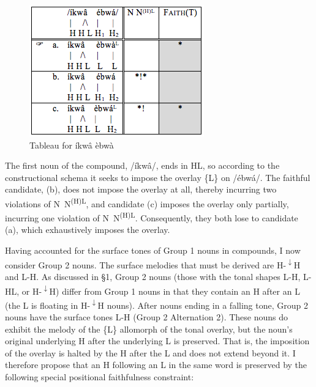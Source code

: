 \documentclass[output=paper]{langscibook}
\begin{document}
  
\begin{figure}
\includegraphics[width=\textwidth]{figures/glewwe-img3.png}
\caption{Tableau for \textup{íkwâ èbwà}}
\label{fig:glewwe:4}
\end{figure}

The first noun of the compound, /íkwâ/, ends in HL, so according to the constructional schema it seeks to impose the overlay \{L\} on /ébwá/. The faithful candidate, (b), does not impose the overlay at all, thereby incurring two violations of N~N\textsuperscript{(H)L}, and candidate (c) imposes the overlay only partially, incurring one violation of N~N\textsuperscript{(H)L}. Consequently, they both lose to candidate (a), which exhaustively imposes the overlay.     

Having accounted for the surface tones of Group 1 nouns in compounds, I now consider Group 2 nouns. The surface melodies that must be derived are H-\textsuperscript{$\downarrow$}H and L-H. As discussed in §1, Group 2 nouns (those with the tonal shapes L-H, L-HL, or H-\textsuperscript{$\downarrow$}H) differ from Group 1 nouns in that they contain an H after an L (the L is floating in H-\textsuperscript{$\downarrow$}H nouns). After nouns ending in a falling tone, Group 2 nouns have the surface tones L-H (Group 2 Alternation 2). These nouns do exhibit the melody of the \{L\} allomorph of the tonal overlay, but the noun’s original underlying H after the underlying L is preserved. That is, the imposition of the overlay is halted by the H after the L and does not extend beyond it. I therefore propose that an H following an L in the same word is preserved by the following special positional faithfulness constraint: 
\end{document}
